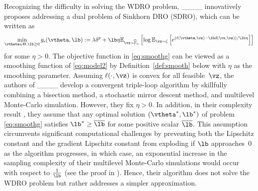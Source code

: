 	Recognizing the difficulty in solving the WDRO problem, ____ innovatively proposes addressing a dual problem of Sinkhorn DRO (SDRO),  
	which can be written as 
	\begin{equation}
		\label{eq:smoothg}
		\min_{\vtheta\in \Theta, \lb\ge 0}g_{\mathrm{s}}(\vtheta, \lb) :=  \lambda \delta^p+  \lb\eta \mathbb{E}_{\vx \sim \widehat{\mathbb{P}}_n}\left[\log \mathbb{E}_{\vz \sim \zeta}\left[e^{(\ell(\vtheta,\vz) -\lb d(\vx,\vz)) / \lb\eta}\right]\right]
	\end{equation}
	for some $\eta>0$.  
	The objective function in \eqref{eq:smoothg} can be viewed as a smoothing function of \eqref{eq:model2} by Definition~\ref{def:smooth} below with $\eta $ as the smoothing parameter. %
	Assuming $\ell(\cdot,\vz)$ is convex for all feasible~$\vz$, the authors of ____ develop a convergent triple-loop algorithm by skillfully combining a bisection method, a stochastic mirror descent method, and multilevel Monte-Carlo simulation.
	However, they fix $\eta>0$. In addition, in their complexity result \cite[Theorem 3]{wang2021sinkhorn}, they assume that any optimal solution $(\vtheta^*,\lb^*)$ of problem \eqref{eq:smoothg} satisfies $\lb^*\ge \overline{\lb}$ for some positive scalar $\overline{\lb}$.
	This assumption circumvents significant computational challenges by preventing both the Lipschitz constant and the gradient Lipschitz constant from exploding if %
	$\lb$ approaches~0 as the algorithm progresses, 
	in which case, an exponential increase in the sampling complexity of their multilevel Monte-Carlo simulations would occur with respect to $\frac{1}{\lb}$ (see the proof in \cite[Proposition EC.4]{wang2021sinkhorn}). 
	Hence, their algorithm does not solve the WDRO problem but rather addresses a simpler approximation.    
	
